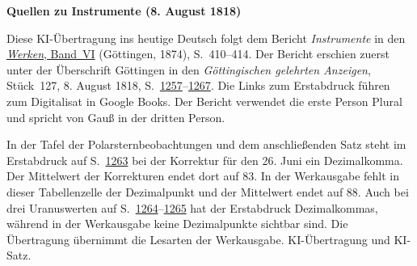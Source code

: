 \clearpage\thispagestyle{empty}
\begin{center}\textbf{Quellen zu Instrumente (8. August 1818)}\end{center}
\noindent Diese KI-Übertragung ins heutige Deutsch folgt dem Bericht \textit{Instrumente} in den \href{https://gdz.sub.uni-goettingen.de/id/PPN236007467}{\textit{Werken}, Band~VI} (Göttingen, 1874), S.~410--414. Der Bericht erschien zuerst unter der Überschrift Göttingen in den \textit{Göttingischen gelehrten Anzeigen}, Stück~127, 8. August 1818, S.~\href{https://books.google.com/books?id=Uy1ZAAAAcAAJ&pg=PA1257}{1257}--\href{https://books.google.com/books?id=Uy1ZAAAAcAAJ&pg=PA1267}{1267}. Die Links zum Erstabdruck führen zum Digitalisat in Google Books. Der Bericht verwendet die erste Person Plural und spricht von Gauß in der dritten Person.
\par\smallskip\noindent In der Tafel der Polarsternbeobachtungen und dem anschließenden Satz steht im Erstabdruck auf S.~\href{https://books.google.com/books?id=Uy1ZAAAAcAAJ&pg=PA1263}{1263} bei der Korrektur für den 26. Juni ein Dezimalkomma. Der Mittelwert der Korrekturen endet dort auf 83. In der Werkausgabe fehlt in dieser Tabellenzelle der Dezimalpunkt und der Mittelwert endet auf 88. Auch bei drei Uranuswerten auf S.~\href{https://books.google.com/books?id=Uy1ZAAAAcAAJ&pg=PA1264}{1264}--\href{https://books.google.com/books?id=Uy1ZAAAAcAAJ&pg=PA1265}{1265} hat der Erstabdruck Dezimalkommas, während in der Werkausgabe keine Dezimalpunkte sichtbar sind. Die Übertragung übernimmt die Lesarten der Werkausgabe. KI-Übertragung und KI-Satz.
\clearpage

